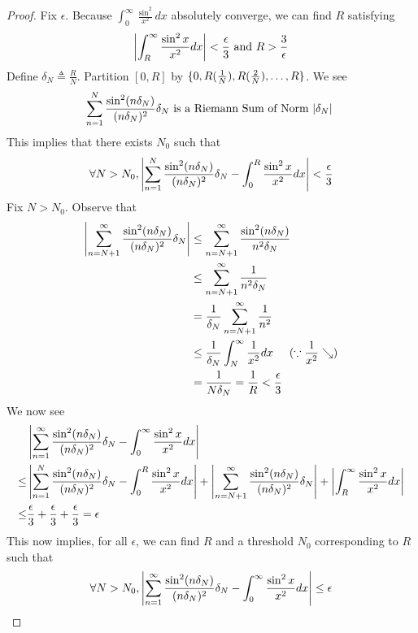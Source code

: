 \documentclass{report}
\begin{document}
\begin{proof}
Fix $\epsilon $. Because $\int_0^\infty \frac{\sin^2}{x^2}dx$ absolutely converge, we can find $R$ satisfying
\begin{align*}
\left|\int_R^\infty \frac{\sin^2 x}{x^2}dx\right|<\frac{\epsilon}{3}\text{ and }R>\frac{3}{\epsilon }
\end{align*}
Define $\delta_N \triangleq \frac{R}{N}$. Partition $[0,R]$ by $\{ 0,R(\frac{1}{N}),R(\frac{2}{N}),\dots ,R  \}$. We see 
\begin{align*}
\sum_{n=1}^N \frac{\sin^2 (n\delta_N)}{(n\delta_N)^2}\delta_N\text{ is a Riemann Sum of Norm $\left|\delta_N\right|$ }
\end{align*}
This implies that there exists $N_0$ such that 
\begin{align*}
\forall N>N_0, \left|\sum_{n=1}^N \frac{\sin^2 (n\delta_N)}{(n\delta_N)^2}\delta_N- \int_0^R \frac{\sin^2 x}{x^2}dx\right|<\frac{\epsilon}{3}
\end{align*}
Fix $N>N_0$. Observe that 
 \begin{align*}
   \left|\sum_{n=N+1}^\infty \frac{\sin^2 (n\delta_N)}{(n\delta_N)^2}\delta_N\right|&\leq \sum_{n=N+1}^\infty \frac{\sin^2 (n\delta_N)}{n^2 \delta_N}\\
&\leq \sum_{n=N+1}^\infty \frac{1}{n^2 \delta_N}\\
&=\frac{1}{\delta_N}\sum_{n=N+1}^\infty \frac{1}{n^2}\\
&\leq \frac{1}{\delta_N}\int_N^\infty \frac{1}{x^2}dx\hspace{0.5cm}(\because \frac{1}{x^2}\searrow )\\
&=\frac{1}{N\delta_N}=\frac{1}{R}<\frac{\epsilon}{3}
\end{align*}
We now see 
\begin{align*}
  &\left|\sum_{n=1}^\infty \frac{\sin^2 (n\delta_N)}{(n\delta_N)^2}\delta_N- \int_0^\infty \frac{\sin^2 x}{x^2}dx\right|\\
  \leq &\left|\sum_{n=1}^N \frac{\sin^2 (n\delta_N)}{(n\delta_N)^2}\delta_N - \int_0^R \frac{\sin^2 x}{x^2}dx\right|+\left|\sum_{n=N+1}^\infty \frac{\sin^2  (n\delta_N)}{(n\delta_N)^2}\delta_N\right|+\left|\int_R^{\infty}\frac{\sin^2 x}{x^2}dx\right|\\
  \leq & \frac{\epsilon }{3}+\frac{\epsilon}{3}+\frac{\epsilon}{3}=\epsilon 
\end{align*}
This now implies, for all $\epsilon $, we can find $R$ and a threshold $N_0$ corresponding to $R$ such that 
\begin{align*}
\forall N>N_0, \abso{\sum_{n=1}^\infty \frac{\sin^2 (n\delta_N)}{(n\delta_N)^2}\delta_N - \int_0^\infty \frac{\sin^2 x}{x^2}dx}\leq \epsilon 

\end{align*}
\end{proof}
\end{document}
